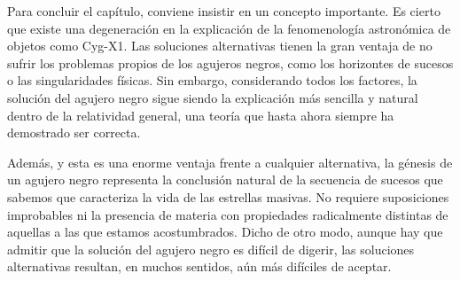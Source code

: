Para concluir el capítulo, conviene insistir en un concepto importante. Es cierto que existe una degeneración en la explicación de la fenomenología astronómica de objetos como Cyg-X1. Las soluciones alternativas tienen la gran ventaja de no sufrir los problemas propios de los agujeros negros, como los horizontes de sucesos o las singularidades físicas. Sin embargo, considerando todos los factores, la solución del agujero negro sigue siendo la explicación más sencilla y natural dentro de la relatividad general, una teoría que hasta ahora siempre ha demostrado ser correcta.

Además, y esta es una enorme ventaja frente a cualquier alternativa, la génesis de un agujero negro representa la conclusión natural de la secuencia de sucesos que sabemos que caracteriza la vida de las estrellas masivas. No requiere suposiciones improbables ni la presencia de materia con propiedades radicalmente distintas de aquellas a las que estamos acostumbrados. Dicho de otro modo, aunque hay que admitir que la solución del agujero negro es difícil de digerir, las soluciones alternativas resultan, en muchos sentidos, aún más difíciles de aceptar.
